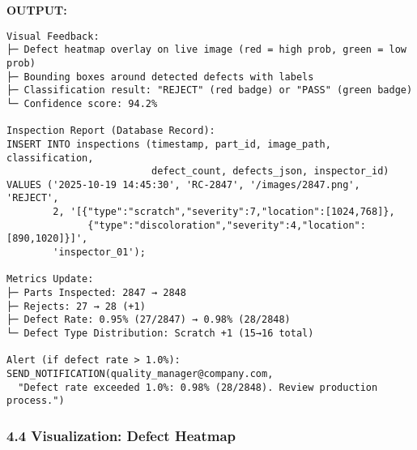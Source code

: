 \documentclass[
]{article}
\begin{document}
\textbf{OUTPUT:}

\begin{verbatim}
Visual Feedback:
├─ Defect heatmap overlay on live image (red = high prob, green = low prob)
├─ Bounding boxes around detected defects with labels
├─ Classification result: "REJECT" (red badge) or "PASS" (green badge)
└─ Confidence score: 94.2%

Inspection Report (Database Record):
INSERT INTO inspections (timestamp, part_id, image_path, classification,
                         defect_count, defects_json, inspector_id)
VALUES ('2025-10-19 14:45:30', 'RC-2847', '/images/2847.png', 'REJECT',
        2, '[{"type":"scratch","severity":7,"location":[1024,768]},
              {"type":"discoloration","severity":4,"location":[890,1020]}]',
        'inspector_01');

Metrics Update:
├─ Parts Inspected: 2847 → 2848
├─ Rejects: 27 → 28 (+1)
├─ Defect Rate: 0.95% (27/2847) → 0.98% (28/2848)
└─ Defect Type Distribution: Scratch +1 (15→16 total)

Alert (if defect rate > 1.0%):
SEND_NOTIFICATION(quality_manager@company.com,
  "Defect rate exceeded 1.0%: 0.98% (28/2848). Review production process.")
\end{verbatim}

\hypertarget{visualization-defect-heatmap}{%
\subsubsection{4.4 Visualization: Defect
Heatmap}\label{visualization-defect-heatmap}}
\end{document}
